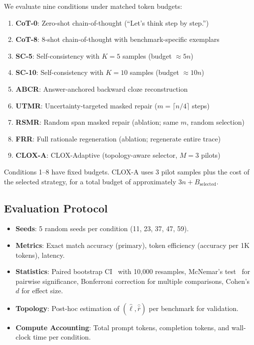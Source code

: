 \documentclass{article}
\begin{document}
We evaluate nine conditions under matched token budgets:

\begin{enumerate}[nosep]
\item \textbf{CoT-0}: Zero-shot chain-of-thought (``Let's think step by step.'')
\item \textbf{CoT-8}: 8-shot chain-of-thought with benchmark-specific exemplars
\item \textbf{SC-5}: Self-consistency with $K=5$ samples (budget $\approx 5n$)
\item \textbf{SC-10}: Self-consistency with $K=10$ samples (budget $\approx 10n$)
\item \textbf{ABCR}: Answer-anchored backward cloze reconstruction
\item \textbf{UTMR}: Uncertainty-targeted masked repair ($m = \lceil n/4 \rceil$ steps)
\item \textbf{RSMR}: Random span masked repair (ablation; same $m$, random selection)
\item \textbf{FRR}: Full rationale regeneration (ablation; regenerate entire trace)
\item \textbf{CLOX-A}: CLOX-Adaptive (topology-aware selector, $M=3$ pilots)
\end{enumerate}

Conditions 1--8 have fixed budgets. CLOX-A uses 3 pilot samples plus the cost of the selected strategy, for a total budget of approximately $3n + B_{\text{selected}}$.

\subsection{Evaluation Protocol}

\begin{itemize}[nosep, leftmargin=*]
\item \textbf{Seeds}: 5 random seeds per condition (11, 23, 37, 47, 59).
\item \textbf{Metrics}: Exact match accuracy (primary), token efficiency (accuracy per 1K tokens), latency.
\item \textbf{Statistics}: Paired bootstrap CI~\citep{efron1979bootstrap} with 10,000 resamples, McNemar's test~\citep{mcnemar1947note} for pairwise significance, Bonferroni correction for multiple comparisons, Cohen's $d$ for effect size.
\item \textbf{Topology}: Post-hoc estimation of $(\hat{\ell}, \hat{\bar{r}})$ per benchmark for validation.
\item \textbf{Compute Accounting}: Total prompt tokens, completion tokens, and wall-clock time per condition.
\end{itemize}
\end{document}
